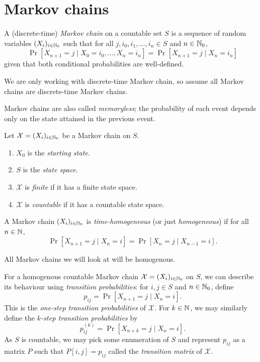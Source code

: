 \section{Markov chains}

\begin{definition}
    A (discrete-time) \emph{Markov chain} on a countable set $S$ is a sequence of random variables $(X_i)_{i\in\mathbb N_0}$ such that for all $j, i_0, i_1, \ldots, i_n \in S$ and $n \in \mathbb N_0$,
    \[
        \Pr[X_{n+1} = j \mid X_0 = i_0, \ldots, X_n = i_n] = \Pr[X_{n+1} = j \mid X_n = i_n]
    \]
    given that both conditional probabilities are well-defined.
\end{definition}

\begin{remark}
    We are only working with discrete-time Markov chain, so assume all Markov chains are discrete-time Markov chains.
\end{remark}

Markov chains are also called \emph{memoryless}; the probability of each event depends only on the state attained in the previous event. 

\begin{definition}
    Let $\mathcal X = (X_i)_{i\in\mathbb N_0}$ be a Markov chain on $S$.
    \begin{enumerate}
        \item $X_0$ is the \emph{starting state}.
        \item $S$ is the \emph{state space}.
        \item $\mathcal X$ is \emph{finite} if it has a finite state space.
        \item $\mathcal X$ is \emph{countable} if it has a countable state space. 
    \end{enumerate}
\end{definition}

\begin{definition}[Homogenity]
    A Markov chain $(X_i)_{i\in\mathbb N_0}$ is \emph{time-homogeneous} (or just \emph{homogeneous}) if for all $n \in \mathbb N$, 
    \[ \Pr[X_{n+1} = j \mid X_n = i] = \Pr[X_{n} = j \mid X_{n-1} = i]. \]
\end{definition}

All Markov chains we will look at will be homogenous.

For a homogenous countable Markov chain $\mathcal X = (X_i)_{i\in\mathbb N_0}$ on $S$, we can describe its behaviour using \emph{transition probabilities}: for $i, j \in S$ and $n \in \mathbb N_0$, define 
\[ p_{ij} = \Pr[X_{n+1} = j \mid X_n = i]. \]
This is the \emph{one-step transition probabilities} of $\mathcal X$. For $k \in \mathbb N$, we may similarly define the \emph{$k$-step transition probabilities} by
\[ p_{ij}^{(k)} = \Pr[X_{n+k} = j \mid X_n = i]. \]
As $S$ is countable, we may pick some enumeration of $S$ and represent $p_{ij}$ as a matrix $P$ such that $P[i,j] = p_{ij}$ called the \emph{transition matrix} of $\mathcal X$. 

